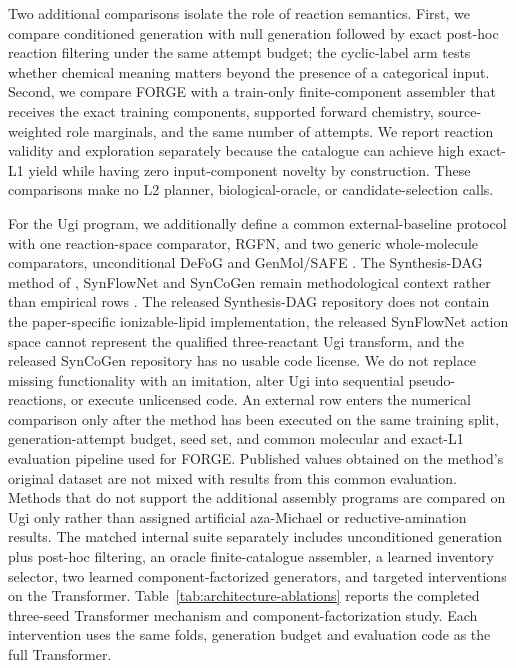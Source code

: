 \documentclass{article}
\begin{document}
Two additional comparisons isolate the role of reaction semantics.
First, we compare conditioned generation with null generation followed by exact post-hoc reaction
filtering under the same attempt budget; the cyclic-label arm tests whether chemical meaning matters
beyond the presence of a categorical input.
Second, we compare FORGE with a train-only finite-component assembler that receives the exact
training components, supported forward chemistry, source-weighted role marginals, and the same
number of attempts.
We report reaction validity and exploration separately because the catalogue can achieve high
exact-L1 yield while having zero input-component novelty by construction.
These comparisons make no L2 planner, biological-oracle, or candidate-selection calls.

For the Ugi program, we additionally define a common external-baseline protocol with one
reaction-space comparator, RGFN, and two generic whole-molecule comparators, unconditional DeFoG
and GenMol/SAFE \citep{koziarski2024rgfn,qin2025defog,lee2025genmol}.
The Synthesis-DAG method of \citet{ou2024deep}, SynFlowNet and SynCoGen remain methodological
context rather than empirical rows \citep{cretu2025synflownet,rekesh2025syncogen}.
The released Synthesis-DAG repository does not contain the paper-specific ionizable-lipid
implementation, the released SynFlowNet action space cannot represent the qualified
three-reactant Ugi transform, and the released SynCoGen repository has no usable code license.
We do not replace missing functionality with an imitation, alter Ugi into sequential
pseudo-reactions, or execute unlicensed code.
An external row enters the numerical comparison only after the method has been executed on the
same training split, generation-attempt budget, seed set, and common molecular and exact-L1
evaluation pipeline used for FORGE.
Published values obtained on the method's original dataset are not mixed with results from this
common evaluation.
Methods that do not support the additional assembly programs are compared on Ugi only rather than
assigned artificial aza-Michael or reductive-amination results.
The matched internal suite separately includes unconditioned generation plus post-hoc filtering, an
oracle finite-catalogue assembler, a learned inventory selector, two learned component-factorized
generators, and targeted interventions on the Transformer. Table~\ref{tab:architecture-ablations}
reports the completed three-seed Transformer mechanism and component-factorization study. Each
intervention uses the same folds, generation budget and evaluation code as the full Transformer.
\end{document}
